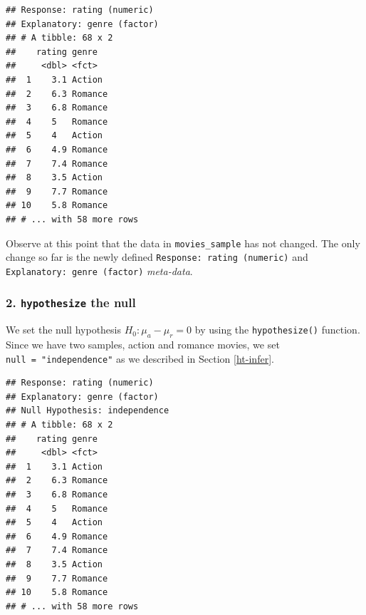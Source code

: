 \documentclass[
]{book}
\newenvironment{Shaded}{\begin{snugshade}}{\end{snugshade}}
\newcommand{\DataTypeTok}[1]{\textcolor[rgb]{0.13,0.29,0.53}{#1}}
\newcommand{\KeywordTok}[1]{\textcolor[rgb]{0.13,0.29,0.53}{\textbf{#1}}}
\newcommand{\NormalTok}[1]{#1}
\newcommand{\OperatorTok}[1]{\textcolor[rgb]{0.81,0.36,0.00}{\textbf{#1}}}
\newcommand{\StringTok}[1]{\textcolor[rgb]{0.31,0.60,0.02}{#1}}
\begin{document}
\begin{Shaded}
\end{Shaded}

\begin{verbatim}
## Response: rating (numeric)
## Explanatory: genre (factor)
## # A tibble: 68 x 2
##    rating genre  
##     <dbl> <fct>  
##  1    3.1 Action 
##  2    6.3 Romance
##  3    6.8 Romance
##  4    5   Romance
##  5    4   Action 
##  6    4.9 Romance
##  7    7.4 Romance
##  8    3.5 Action 
##  9    7.7 Romance
## 10    5.8 Romance
## # ... with 58 more rows
\end{verbatim}

Observe at this point that the data in \texttt{movies\_sample} has not changed. The only change so far is the newly defined \texttt{Response:\ rating\ (numeric)} and \texttt{Explanatory:\ genre\ (factor)} \emph{meta-data}.

\hypertarget{hypothesize-the-null-1}{%
\subsubsection*{\texorpdfstring{2. \texttt{hypothesize} the null}{2. hypothesize the null}}\label{hypothesize-the-null-1}}

We set the null hypothesis \(H_0: \mu_a - \mu_r = 0\) by using the \texttt{hypothesize()} function. Since we have two samples, action and romance movies, we set \texttt{null\ =\ "independence"} as we described in Section \ref{ht-infer}.

\begin{Shaded}
\end{Shaded}

\begin{verbatim}
## Response: rating (numeric)
## Explanatory: genre (factor)
## Null Hypothesis: independence
## # A tibble: 68 x 2
##    rating genre  
##     <dbl> <fct>  
##  1    3.1 Action 
##  2    6.3 Romance
##  3    6.8 Romance
##  4    5   Romance
##  5    4   Action 
##  6    4.9 Romance
##  7    7.4 Romance
##  8    3.5 Action 
##  9    7.7 Romance
## 10    5.8 Romance
## # ... with 58 more rows
\end{verbatim}
\end{document}
